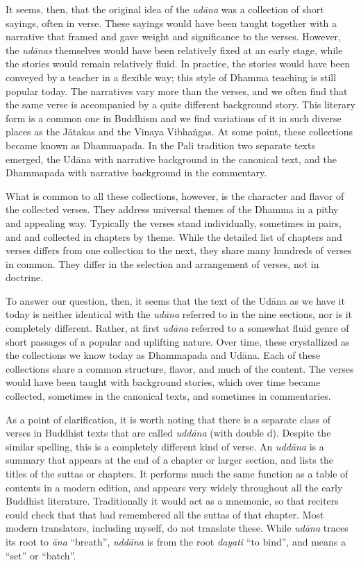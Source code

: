 \documentclass[12pt,openany]{book}%
\begin{document}
It seems, then, that the original idea of the \textit{\textsanskrit{udāna}} was a collection of short sayings, often in verse. These sayings would have been taught together with a narrative that framed and gave weight and significance to the verses. However, the \textit{\textsanskrit{udānas}} themselves would have been relatively fixed at an early stage, while the stories would remain relatively fluid. In practice, the stories would have been conveyed by a teacher in a flexible way; this style of Dhamma teaching is still popular today. The narratives vary more than the verses, and we often find that the same verse is accompanied by a quite different background story. This literary form is a common one in Buddhism and we find variations of it in such diverse places as the \textsanskrit{Jātakas} and the Vinaya \textsanskrit{Vibhaṅgas}. At some point, these collections became known as Dhammapada. In the Pali tradition two separate texts emerged, the \textsanskrit{Udāna} with narrative background in the canonical text, and the Dhammapada with narrative background in the commentary. 

What is common to all these collections, however, is the character and flavor of the collected verses. They address universal themes of the Dhamma in a pithy and appealing way. Typically the verses stand individually, sometimes in pairs, and and collected in chapters by theme. While the detailed list of chapters and verses differs from one collection to the next, they share many hundreds of verses in common. They differ in the selection and arrangement of verses, not in doctrine.

To answer our question, then, it seems that the text of the \textsanskrit{Udāna} as we have it today is neither identical with the \textit{\textsanskrit{udāna}} referred to in the nine sections, nor is it completely different. Rather, at first \textit{\textsanskrit{udāna}} referred to a somewhat fluid genre of short passages of a popular and uplifting nature. Over time, these crystallized as the collections we know today as Dhammapada and \textsanskrit{Udāna}. Each of these collections share a common structure, flavor, and much of the content. The verses would have been taught with background stories, which over time became collected, sometimes in the canonical texts, and sometimes in commentaries.

As a point of clarification, it is worth noting that there is a separate class of verses in Buddhist texts that are called \textit{\textsanskrit{uddāna}} (with double d). Despite the similar spelling, this is a completely different kind of verse. An \textit{\textsanskrit{uddāna}} is a summary that appears at the end of a chapter or larger section, and lists the titles of the suttas or chapters. It performs much the same function as a table of contents in a modern edition, and appears very widely throughout all the early Buddhist literature. Traditionally it would act as a mnemonic, so that reciters could check that that had remembered all the suttas of that chapter. Most modern translators, including myself, do not translate these. While \textit{\textsanskrit{udāna}} traces its root to \textit{\textsanskrit{āna}} “breath”, \textit{\textsanskrit{uddāna}} is from the root \textit{dayati} “to bind”, and means a “set” or “batch”. 
\end{document}
